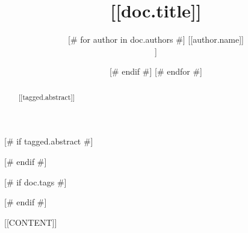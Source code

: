 \documentclass{article}
\title{[[doc.title]]}
\date{\displaydate{articleDate}}
[# else #]
\date{}
[# endif #]
\author{[# for author in doc.authors #]
[[author.name]]\\
[[author.affiliation]]\\
[# if not loop.last #]
\and
[# endif #]
[# endfor #]
}
\begin{document}
\maketitle

[# if tagged.abstract #]
\begin{abstract}
  [[tagged.abstract]]
\end{abstract}

[# endif #]


[# if doc.tags #]

[# endif #]

[[CONTENT]]




\end{document}
